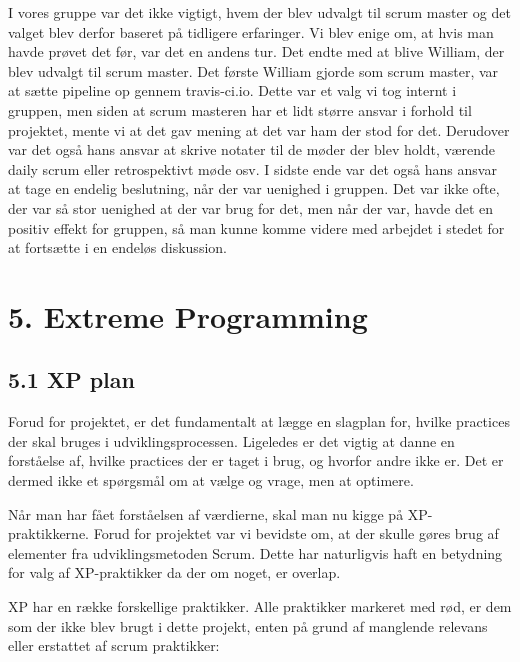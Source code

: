 \documentclass[11pt]{report}
\begin{document}
I vores gruppe var det ikke vigtigt, hvem der blev udvalgt til scrum master og det valget blev derfor baseret på tidligere erfaringer. Vi blev enige om, at hvis man havde prøvet det før, var det en andens tur. Det endte med at blive William, der blev udvalgt til scrum master. Det første  William gjorde som scrum master, var at sætte pipeline op gennem travis-ci.io. Dette var et valg vi tog internt i gruppen, men siden at scrum masteren har et lidt større ansvar i forhold til projektet, mente vi at det gav mening at det var ham der stod for det. Derudover var det også hans ansvar at skrive notater til de møder der blev holdt, værende daily scrum eller retrospektivt møde osv. I sidste ende var det også hans ansvar at tage en endelig beslutning, når der var uenighed i gruppen. Det var ikke ofte, der var så stor uenighed at der var brug for det, men når der var, havde det en positiv effekt for gruppen, så man kunne komme videre med arbejdet i stedet for at fortsætte i en endeløs diskussion. 

\chapter*{5. Extreme Programming}
\section*{5.1 XP plan}
Forud for projektet, er det fundamentalt at lægge en slagplan for, hvilke practices der skal bruges i udviklingsprocessen. Ligeledes er det vigtig at danne en forståelse af, hvilke practices der er taget i brug, og hvorfor andre ikke er. Det er dermed ikke et spørgsmål om at vælge og vrage, men at optimere.

Når man har fået forståelsen af værdierne, skal man nu kigge på XP-praktikkerne. Forud for projektet var vi bevidste om, at der skulle gøres brug af elementer fra udviklingsmetoden Scrum. Dette har naturligvis haft en betydning for valg af XP-praktikker da der om noget, er overlap.

XP har en række forskellige praktikker. Alle praktikker markeret med rød, er dem som der ikke blev brugt i dette projekt, enten på grund af manglende relevans eller erstattet af scrum praktikker: 
\end{document}

